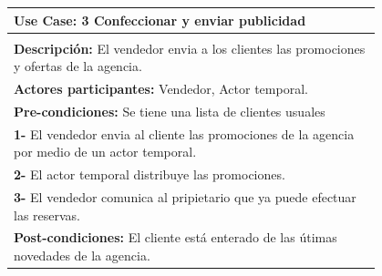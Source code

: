 \documentclass[12pt,a4paper,titlepage,oneside]{article}
\begin{document}
\begin{tabular}{| l | p{0.8\linewidth} |} \hline
	\multicolumn{2}{|p{0.8\linewidth}|}{\textbf{Use Case:} 3 Confeccionar y enviar publicidad} \\ \hline
	\multicolumn{2}{|c|}{} \\ \hline
	\multicolumn{2}{|p{0.8\linewidth}|}{\textbf{Descripci\'on:} El vendedor envia a los clientes las promociones y ofertas de la agencia.} \\ \hline
	\multicolumn{2}{|p{0.8\linewidth}|}{\textbf{Actores participantes:} Vendedor, Actor temporal.} \\ \hline
	\multicolumn{2}{|p{0.8\linewidth}|}{\textbf{Pre-condiciones:} Se tiene una lista de clientes usuales} \\ \hline
	\multicolumn{2}{|p{0.8\linewidth}|}{\textbf{1-} El vendedor envia al cliente las promociones de la agencia por medio de un actor temporal.} \\
	\multicolumn{2}{|p{0.8\linewidth}|}{\textbf{2-} El actor temporal distribuye las promociones.} \\ \hline
	\multicolumn{2}{|p{0.8\linewidth}|}{\textbf{3-} El vendedor comunica al pripietario que ya puede efectuar las reservas.}\\ \hline
	\multicolumn{2}{|p{0.8\linewidth}|}{\textbf{Post-condiciones:} El cliente está enterado de las útimas novedades de la agencia.}\\ \hline
\end{tabular} \\\\
\\\\\\\\
\end{document}
